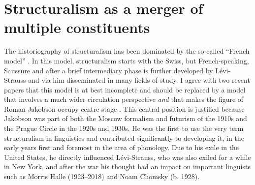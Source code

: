 \documentclass[output=paper]{langscibook}
\begin{document}
\section{Structuralism as a merger of multiple constituents}
\label{sec:karstens:structuralism}

The historiography of structuralism has been dominated by the so-called ``French model'' \citep[cf.][]{Flack2016}. In this model, structuralism starts with the Swiss, but French-speaking, Saussure and after a brief intermediary phase is further developed by Lévi-Strauss and via him disseminated in many fields of study. I agree with two recent papers that this model is at best incomplete and should be replaced by a model that involves a much wider circulation perspective \emph{and} that makes the figure of Roman Jakobson occupy centre stage \citep[see][]{Percival2011,Flack2016}. This central position is justified because Jakobson was part of both the Moscow formalism and futurism of the 1910s and the Prague Circle in the 1920s and 1930s. He was the first to use the very term structuralism in linguistics and contributed significantly to developing it, in the early years first and foremost in the area of phonology. Due to his exile in the United States, he directly influenced Lévi-Strauss, who was also exiled for a while in New York, and after the war his thought had an impact on important linguists such as Morris Halle (1923--2018) and Noam Chomsky (b. 1928). 
\end{document}
